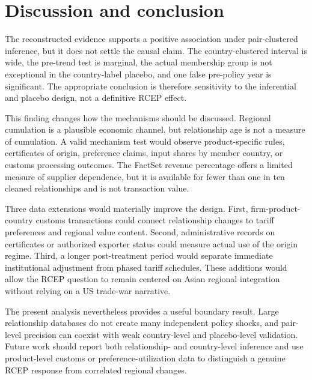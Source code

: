 \documentclass[preprint,12pt,authoryear]{elsarticle}
\begin{document}
\section{Discussion and conclusion}

The reconstructed evidence supports a positive association under pair-clustered inference, but it does not settle the causal claim. The country-clustered interval is wide, the pre-trend test is marginal, the actual membership group is not exceptional in the country-label placebo, and one false pre-policy year is significant. The appropriate conclusion is therefore sensitivity to the inferential and placebo design, not a definitive RCEP effect.

This finding changes how the mechanisms should be discussed. Regional cumulation is a plausible economic channel, but relationship age is not a measure of cumulation. A valid mechanism test would observe product-specific rules, certificates of origin, preference claims, input shares by member country, or customs processing outcomes. The FactSet revenue percentage offers a limited measure of supplier dependence, but it is available for fewer than one in ten cleaned relationships and is not transaction value.

Three data extensions would materially improve the design. First, firm-product-country customs transactions could connect relationship changes to tariff preferences and regional value content. Second, administrative records on certificates or authorized exporter status could measure actual use of the origin regime. Third, a longer post-treatment period would separate immediate institutional adjustment from phased tariff schedules. These additions would allow the RCEP question to remain centered on Asian regional integration without relying on a US trade-war narrative.

The present analysis nevertheless provides a useful boundary result. Large relationship databases do not create many independent policy shocks, and pair-level precision can coexist with weak country-level and placebo-level validation. Future work should report both relationship- and country-level inference and use product-level customs or preference-utilization data to distinguish a genuine RCEP response from correlated regional changes.
\end{document}
